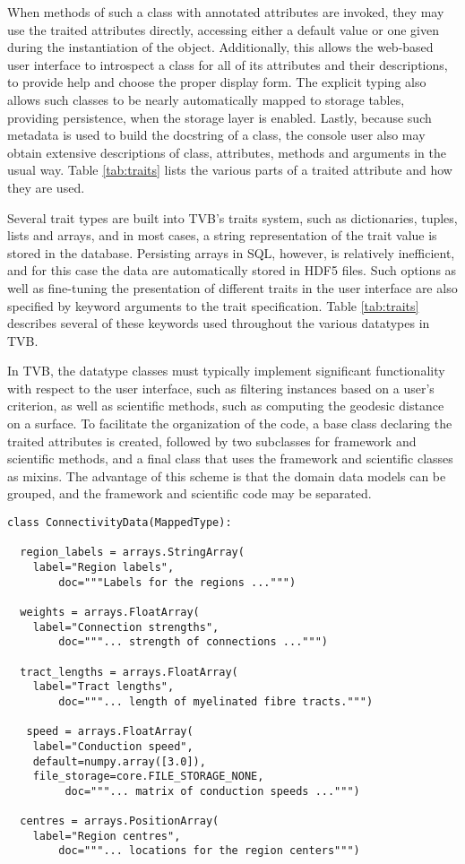 \documentclass{bioinfo}
\begin{document}
When methods of such a class with annotated attributes are invoked, they may use
the traited attributes directly, accessing either a default value or one given
during the instantiation of the object. Additionally, this allows the web-based
user interface to introspect a class for all of its attributes and their
descriptions, to provide help and choose the proper display form. The explicit
typing also allows such classes to be nearly automatically mapped to storage
tables, providing persistence, when the storage layer is enabled.  Lastly,
because such metadata is used to build the docstring of a class, the console
user also may obtain extensive descriptions of class, attributes, methods and
arguments in the usual way. Table \ref{tab:traits} lists the various parts 
of a traited attribute and how they are used. 

Several trait types are built into TVB's traits system, such as dictionaries,
tuples, lists and arrays, and in most cases, a string representation of the
trait value is stored in the database.  Persisting arrays in SQL, however, is
relatively inefficient, and for this case the data are automatically stored in
HDF5 files. Such options as well as fine-tuning the presentation of different
traits in the user interface are also specified by keyword arguments to the
trait specification.  Table \ref{tab:traits} describes several of these
keywords used throughout the various datatypes in TVB.

In TVB, the datatype classes must typically implement significant functionality
with respect to the user interface, such as filtering instances based on a
user's criterion, as well as scientific methods, such as computing the geodesic
distance on a surface. To facilitate the organization of the code, a base class
declaring the traited attributes is created, followed by two subclasses for 
framework and scientific methods, and a final class that uses the framework and
scientific classes as mixins. The advantage of this scheme is that the domain 
data models can be grouped, and the framework and scientific code may be separated. 

\begin{lstlisting}[caption={The ConnectivityData listing},
                   label={lst:ConnectivityData}]
class ConnectivityData(MappedType):

  region_labels = arrays.StringArray( 
	label="Region labels", 
        doc="""Labels for the regions ...""")

  weights = arrays.FloatArray( 
	label="Connection strengths",
        doc="""... strength of connections ...""")

  tract_lengths = arrays.FloatArray( 
	label="Tract lengths",
        doc="""... length of myelinated fibre tracts.""")

   speed = arrays.FloatArray( 
	label="Conduction speed", 
	default=numpy.array([3.0]), 
	file_storage=core.FILE_STORAGE_NONE,
         doc="""... matrix of conduction speeds ...""")

  centres = arrays.PositionArray( 
	label="Region centres",
        doc="""... locations for the region centers""")
\end{lstlisting}
\end{document}
